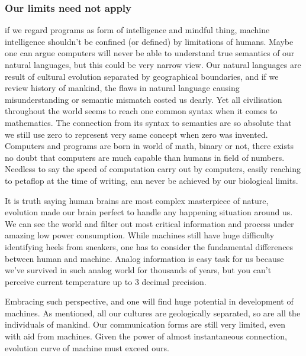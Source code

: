 \documentclass[11pt]{article}
\newenvironment{draft}{\color{dark-cornflower-blue-2}}{\ignorespacesafterend}
\begin{document}
\subsubsection*{Our limits need not apply}
\begin{draft}

if we regard programs  as form of intelligence and mindful thing, machine intelligence shouldn't be confined (or defined) by limitations of humans. Maybe one can argue computers will never be able to understand true semantics of our natural languages, but this could be very narrow view. Our natural languages are result of cultural evolution separated by geographical boundaries, and if we review history of mankind, the flaws in natural language causing misunderstanding or semantic mismatch costed us dearly. Yet all civilisation throughout the world seems to reach one common syntax when it comes to mathematics. The connection from its syntax to semantics are so absolute that we still use zero to represent very same concept when zero was invented. Computers and programs are born in world of math, binary or not, there exists no doubt that computers are much capable than humans in field of numbers. Needless to say the speed of computation carry out by computers, easily reaching to petaflop at the time of writing, can never be achieved by our biological limits. 

It is truth saying human brains are most complex masterpiece of nature, evolution made our brain perfect to handle any happening situation around us. We can see the world and filter out most critical information and process under amazing low power consumption. While machines still have huge difficulty identifying heels from sneakers, one has to consider the fundamental differences between human and machine. Analog information is easy task for us because we've survived in such analog world for thousands of years, but you can't perceive current temperature up to 3 decimal precision. 

Embracing such perspective, and one will find huge potential in development of machines. As mentioned, all our cultures are geologically separated, so are all the individuals of mankind. Our communication forms are still very limited, even with aid from machines. Given the power of almost instantaneous connection, evolution curve of machine must exceed ours. 
\end{draft}




\end{document}
